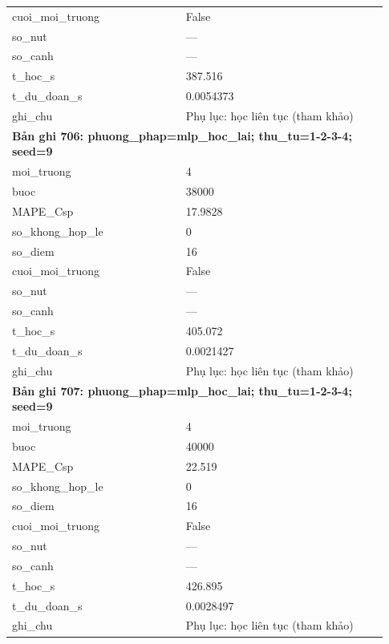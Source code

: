 \begin{longtable}{p{0.43\linewidth}p{0.50\linewidth}}
cuoi\_\allowbreak moi\_\allowbreak truong & False \\
so\_\allowbreak nut & — \\
so\_\allowbreak canh & — \\
t\_\allowbreak hoc\_\allowbreak s & 387.516 \\
t\_\allowbreak du\_\allowbreak doan\_\allowbreak s & 0.0054373 \\
ghi\_\allowbreak chu & Phụ lục: học liên tục (tham khảo) \\
\midrule
\multicolumn{2}{p{0.95\linewidth}}{\textbf{Bản ghi 706: phuong\_phap=mlp\_hoc\_lai; thu\_tu=1-2-3-4; seed=9}} \\
moi\_\allowbreak truong & 4 \\
buoc & 38000 \\
MAPE\_\allowbreak Csp & 17.9828 \\
so\_\allowbreak khong\_\allowbreak hop\_\allowbreak le & 0 \\
so\_\allowbreak diem & 16 \\
cuoi\_\allowbreak moi\_\allowbreak truong & False \\
so\_\allowbreak nut & — \\
so\_\allowbreak canh & — \\
t\_\allowbreak hoc\_\allowbreak s & 405.072 \\
t\_\allowbreak du\_\allowbreak doan\_\allowbreak s & 0.0021427 \\
ghi\_\allowbreak chu & Phụ lục: học liên tục (tham khảo) \\
\midrule
\multicolumn{2}{p{0.95\linewidth}}{\textbf{Bản ghi 707: phuong\_phap=mlp\_hoc\_lai; thu\_tu=1-2-3-4; seed=9}} \\
moi\_\allowbreak truong & 4 \\
buoc & 40000 \\
MAPE\_\allowbreak Csp & 22.519 \\
so\_\allowbreak khong\_\allowbreak hop\_\allowbreak le & 0 \\
so\_\allowbreak diem & 16 \\
cuoi\_\allowbreak moi\_\allowbreak truong & False \\
so\_\allowbreak nut & — \\
so\_\allowbreak canh & — \\
t\_\allowbreak hoc\_\allowbreak s & 426.895 \\
t\_\allowbreak du\_\allowbreak doan\_\allowbreak s & 0.0028497 \\
ghi\_\allowbreak chu & Phụ lục: học liên tục (tham khảo) \\

\end{longtable}
